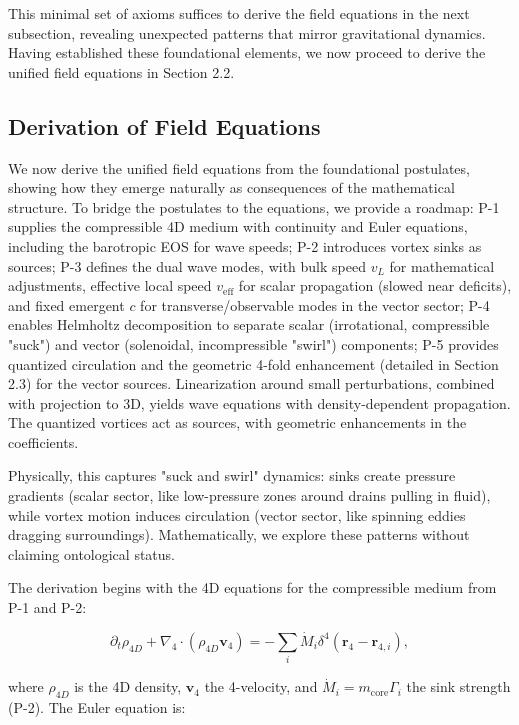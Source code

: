 This minimal set of axioms suffices to derive the field equations in the next subsection, revealing unexpected patterns that mirror gravitational dynamics. Having established these foundational elements, we now proceed to derive the unified field equations in Section 2.2.

\subsection{Derivation of Field Equations}

We now derive the unified field equations from the foundational postulates, showing how they emerge naturally as consequences of the mathematical structure. To bridge the postulates to the equations, we provide a roadmap: P-1 supplies the compressible 4D medium with continuity and Euler equations, including the barotropic EOS for wave speeds; P-2 introduces vortex sinks as sources; P-3 defines the dual wave modes, with bulk speed $v_L$ for mathematical adjustments, effective local speed $v_{\text{eff}}$ for scalar propagation (slowed near deficits), and fixed emergent $c$ for transverse/observable modes in the vector sector; P-4 enables Helmholtz decomposition to separate scalar (irrotational, compressible "suck") and vector (solenoidal, incompressible "swirl") components; P-5 provides quantized circulation and the geometric 4-fold enhancement (detailed in Section 2.3) for the vector sources. Linearization around small perturbations, combined with projection to 3D, yields wave equations with density-dependent propagation. The quantized vortices act as sources, with geometric enhancements in the coefficients.

Physically, this captures "suck and swirl" dynamics: sinks create pressure gradients (scalar sector, like low-pressure zones around drains pulling in fluid), while vortex motion induces circulation (vector sector, like spinning eddies dragging surroundings). Mathematically, we explore these patterns without claiming ontological status.

The derivation begins with the 4D equations for the compressible medium from P-1 and P-2:

\begin{equation}
\partial_t \rho_{4D} + \nabla_4 \cdot (\rho_{4D} \mathbf{v}_4) = -\sum_i \dot{M}_i \delta^4(\mathbf{r}_4 - \mathbf{r}_{4,i}),
\end{equation}

where $\rho_{4D}$ is the 4D density, $\mathbf{v}_4$ the 4-velocity, and $\dot{M}_i = m_{\text{core}} \Gamma_i$ the sink strength (P-2). The Euler equation is:

